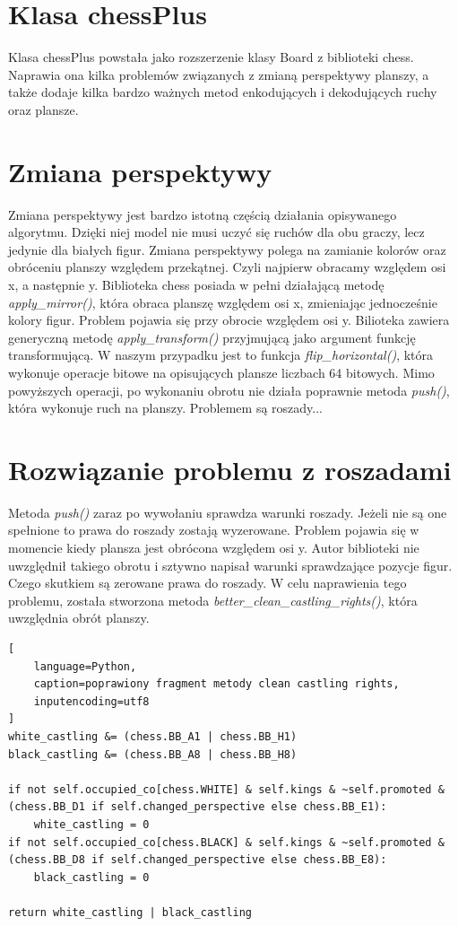 \section*{Klasa chessPlus}
Klasa chessPlus powstała jako rozszerzenie klasy Board z biblioteki chess. Naprawia ona kilka problemów związanych z zmianą perspektywy planszy, a także dodaje kilka bardzo ważnych metod enkodujących i dekodujących ruchy oraz plansze.

\section*{Zmiana perspektywy}
Zmiana perspektywy jest bardzo istotną częścią działania opisywanego algorytmu. Dzięki niej model nie musi uczyć się ruchów dla obu graczy, lecz jedynie dla białych figur. Zmiana perspektywy polega na zamianie kolorów oraz obróceniu planszy względem przekątnej. Czyli najpierw obracamy względem osi x, a następnie y. Biblioteka chess posiada w pełni działającą metodę \textit{apply\_mirror()}, która obraca planszę względem osi x, zmieniając jednocześnie kolory figur. Problem pojawia się przy obrocie względem osi y. Bilioteka zawiera generyczną metodę \textit{apply\_transform()} przyjmującą jako argument funkcję transformującą. W naszym przypadku jest to funkcja \textit{flip\_horizontal()}, która wykonuje operacje bitowe na opisujących plansze liczbach 64 bitowych. Mimo powyższych operacji, po wykonaniu obrotu nie działa poprawnie metoda \textit{push()}, która wykonuje ruch na planszy. Problemem są roszady...

\section*{Rozwiązanie problemu z roszadami}
Metoda \textit{push()} zaraz po wywołaniu sprawdza warunki roszady. Jeżeli nie są one spełnione to prawa do roszady zostają wyzerowane. Problem pojawia się w momencie kiedy plansza jest obrócona względem osi y. Autor biblioteki nie uwzględnił takiego obrotu i sztywno napisał warunki sprawdzające pozycje figur. Czego skutkiem są zerowane prawa do roszady. W celu naprawienia tego problemu, została stworzona metoda \textit{better\_clean\_castling\_rights()}, która uwzględnia obrót planszy.

\lstset{style=codeListingStyle}
\begin{lstlisting}[
    language=Python, 
    caption=poprawiony fragment metody clean castling rights,
    inputencoding=utf8
]
white_castling &= (chess.BB_A1 | chess.BB_H1)
black_castling &= (chess.BB_A8 | chess.BB_H8)

if not self.occupied_co[chess.WHITE] & self.kings & ~self.promoted & (chess.BB_D1 if self.changed_perspective else chess.BB_E1):
    white_castling = 0
if not self.occupied_co[chess.BLACK] & self.kings & ~self.promoted & (chess.BB_D8 if self.changed_perspective else chess.BB_E8):
    black_castling = 0

return white_castling | black_castling
\end{lstlisting}

